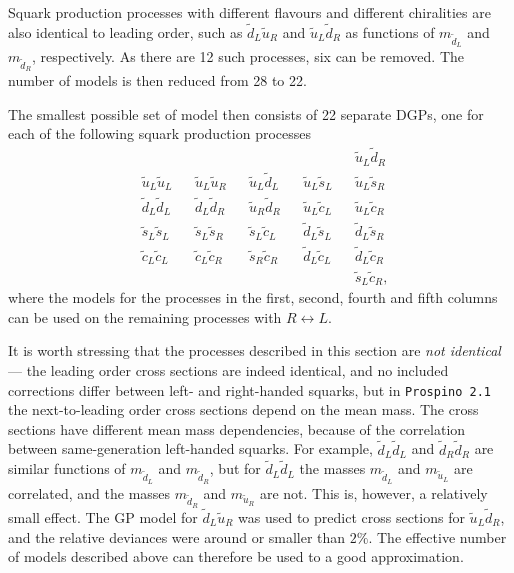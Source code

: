 \documentclass[twoside,english]{uiofysmaster}
\begin{document}
{{%

Squark production processes with different flavours and different chiralities are also identical to leading order, such as $\widetilde{d}_L \widetilde{u}_R$ and $\widetilde{u}_L \widetilde{d}_R$ as functions of $m_{\widetilde{d}_L}$ and $m_{\widetilde{d}_R}$, respectively. As there are 12 such processes, six can be removed. The number of models is then reduced from 28 to 22. 

The smallest possible set of model then consists of 22 separate DGPs, one for each of the following squark production processes
\begin{align*}
& && && && && \widetilde{u}_L \widetilde{d}_R\\ 
& \widetilde{u}_L \widetilde{u}_L && \widetilde{u}_L \widetilde{u}_R && \widetilde{u}_L \widetilde{d}_L && \widetilde{u}_L \widetilde{s}_L && \widetilde{u}_L \widetilde{s}_R\\
& \widetilde{d}_L \widetilde{d}_L && \widetilde{d}_L \widetilde{d}_R && \widetilde{u}_R \widetilde{d}_R && \widetilde{u}_L \widetilde{c}_L && \widetilde{u}_L \widetilde{c}_R\\ 
& \widetilde{s}_L \widetilde{s}_L && \widetilde{s}_L \widetilde{s}_R && \widetilde{s}_L \widetilde{c}_L && \widetilde{d}_L \widetilde{s}_L && \widetilde{d}_L \widetilde{s}_R\\
& \widetilde{c}_L \widetilde{c}_L && \widetilde{c}_L \widetilde{c}_R && \widetilde{s}_R \widetilde{c}_R && \widetilde{d}_L \widetilde{c}_L && \widetilde{d}_L \widetilde{c}_R \\
&  &&  &&  && && \widetilde{s}_L \widetilde{c}_R,
\end{align*}
where the models for the processes in the first, second, fourth and fifth columns can be used on the remaining processes with $R \leftrightarrow L$.

It is worth stressing that the processes described in this section are \textit{not identical} --- the leading order cross sections are indeed identical, and no included corrections differ between left- and right-handed squarks, but in \verb|Prospino 2.1| the next-to-leading order cross sections depend on the mean mass. The cross sections have different mean mass dependencies, because of the correlation between same-generation left-handed squarks. For example, $\widetilde{d}_L \widetilde{d}_L$ and $\widetilde{d}_R \widetilde{d}_R$ are similar functions of $m_{\widetilde{d}_L}$ and $m_{\widetilde{d}_R}$, but for $\widetilde{d}_L \widetilde{d}_L$ the masses $m_{\widetilde{d}_L}$ and $m_{\widetilde{u}_L}$ are correlated, and the masses $m_{\widetilde{d}_R}$ and $m_{\widetilde{u}_R}$ are not. This is, however, a relatively small effect. The GP model for $\widetilde{d}_L \widetilde{u}_R$ was used to predict cross sections for $\widetilde{u}_L \widetilde{d}_R$, and the relative deviances were around or smaller than $2\%$. The effective number of models described above can therefore be used to a good approximation.
 

}}
\end{document}
